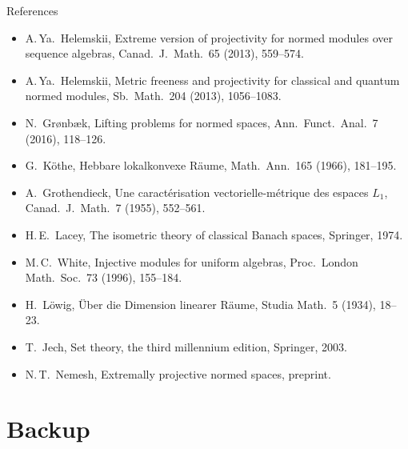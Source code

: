 \documentclass[10pt,aspectratio=169]{beamer}
\begin{document}
\begin{frame}{References}
  \footnotesize
  \begin{itemize}
    \item[] A.\,Ya.~Helemskii, Extreme version of projectivity for normed modules
      over sequence algebras, Canad.\ J.\ Math.\ 65 (2013), 559--574.
    \item[] A.\,Ya.~Helemskii, Metric freeness and projectivity for classical and
      quantum normed modules, Sb.\ Math.\ 204 (2013), 1056--1083.
    \item[] N.~Gr{\o}nb{\ae}k, Lifting problems for normed spaces, Ann.\ Funct.\ Anal.\
      7 (2016), 118--126.
    \item[] G.~K\"othe, Hebbare lokalkonvexe R\"aume, Math.\ Ann.\ 165 (1966), 181--195.
    \item[] A.~Grothendieck, Une caract\'erisation vectorielle-m\'etrique des
      espaces $L_1$, Canad.\ J.\ Math.\ 7 (1955), 552--561.
    \item[] H.\,E.~Lacey, The isometric theory of classical Banach spaces, Springer, 1974.
    \item[] M.\,C.~White, Injective modules for uniform algebras, Proc.\ London
      Math.\ Soc.\ 73 (1996), 155--184.
    \item[] H.~L\"owig, \"Uber die Dimension linearer R\"aume, Studia Math.\ 5 (1934), 18--23.
    \item[] T.~Jech, Set theory, the third millennium edition, Springer, 2003.
    \item[] N.\,T.~Nemesh, Extremally projective normed spaces, preprint.
  \end{itemize}
\end{frame}

\appendix
\section*{Backup}
\end{document}
